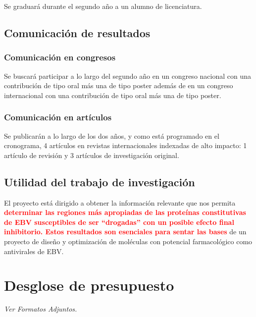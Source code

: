 \documentclass[11pt,letterpaper,titlepage]{article} %
\newcommand{\red}[1]{\textcolor{red}{\textbf{#1}}}
\begin{document}
Se graduará durante el segundo año a un alumno de licenciatura.

\subsection{Comunicación de resultados}

\subsubsection{Comunicación en congresos}

Se buscará participar a lo largo del segundo año en un congreso nacional con una
contribución de tipo oral más una de tipo poster además de en un congreso internacional con
una contribución de tipo oral más una de tipo poster.

\subsubsection{Comunicación en artículos}

Se publicarán a lo largo de los dos años, y como está programado en el
cronograma, 4 artículos en revistas internacionales indexadas de alto impacto: 1
artículo de revisión y 3 artículos de investigación original.

\subsection{Utilidad del trabajo de investigación}

El proyecto está dirigido a obtener la información relevante que nos permita
\red{determinar las regiones más apropiadas de las proteínas constitutivas de
  EBV susceptibles de ser ``drogadas'' con un posible efecto final inhibitorio.
  Estos resultados son esenciales para sentar las bases} de un proyecto de
diseño y optimización de moléculas con potencial farmacológico como antivirales
de EBV.

\section{Desglose de presupuesto}
\emph{Ver Formatos Adjuntos.}


\newpage



\end{document}
